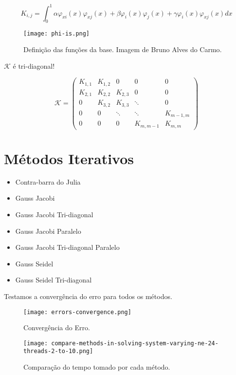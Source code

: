 \begin{frame}

\[K_{i,j} = \int_{0}^{1} \alpha \varphi_{xi}(x) \varphi_{xj}(x) + \beta \varphi_i(x) \varphi_j(x) + \gamma \varphi_i(x) \varphi_{xj}(x) dx \]

  \begin{figure}[H]
    \centering
    \texttt{[image: phi-is.png]}
    \caption{Definição das funções da base. Imagem de Bruno Alves do Carmo\cite{Bacarmo}.}
  \end{figure}
\end{frame}

\begin{frame}
  $\mathcal{K}$ é tri-diagonal!

  \vspace{1cm}

  \[\mathcal{K} =
  \begin{pmatrix}
    K_{1,1} & K_{1,2} & 0       & 0 & 0 \\
    K_{2,1} & K_{2,2} & K_{2,3} & 0 & 0 \\
    0       & K_{3,2} & K_{3,3} & \ddots & 0   \\
    0  & 0  & \ddots  & \ddots & K_{m-1,m} \\
    0  & 0  &  0      & K_{m,m-1} & K_{m,m}
  \end{pmatrix}\]
\end{frame}

\section{Métodos Iterativos}
\begin{frame}
  \begin{itemize}
    \item Contra-barra do Julia
    \item Gauss Jacobi
    \item Gauss Jacobi Tri-diagonal
    \item Gauss Jacobi Paralelo
    \item Gauss Jacobi Tri-diagonal Paralelo
    \item Gauss Seidel
    \item Gauss Seidel Tri-diagonal
  \end{itemize}
\end{frame}

\begin{frame}
  Testamos a convergência do erro para todos os métodos.
  \begin{figure}[H]
    \centering
    \texttt{[image: errors-convergence.png]}
    \caption{Convergência do Erro.}
  \end{figure}
\end{frame}

\begin{frame}
  \begin{figure}[H]
    \centering
    \texttt{[image: compare-methods-in-solving-system-varying-ne-24-threads-2-to-10.png]}
    \caption{Comparação do tempo tomado por cada método.}
  \end{figure}
\end{frame}